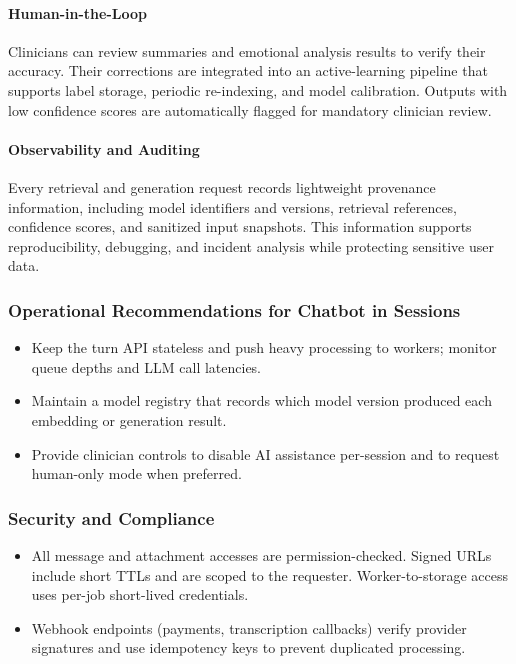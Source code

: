 \documentclass[a4paper,12pt]{report}
\begin{document}
\paragraph{Human-in-the-Loop}
Clinicians can review summaries and emotional analysis results to verify their accuracy. Their corrections are integrated into an active-learning pipeline that supports label storage, periodic re-indexing, and model calibration. Outputs with low confidence scores are automatically flagged for mandatory clinician review.

\paragraph{Observability and Auditing}
Every retrieval and generation request records lightweight provenance information, including model identifiers and versions, retrieval references, confidence scores, and sanitized input snapshots. This information supports reproducibility, debugging, and incident analysis while protecting sensitive user data.

\subsubsection{Operational Recommendations for Chatbot in Sessions}
\begin{itemize}[leftmargin=*]
  \item[--] Keep the turn API stateless and push heavy processing to workers; monitor queue depths and LLM call latencies.
  \item[--] Maintain a model registry that records which model version produced each embedding or generation result.
  \item[--] Provide clinician controls to disable AI assistance per-session and to request human-only mode when preferred.
\end{itemize}

\subsubsection{Security and Compliance}
\begin{itemize}[leftmargin=*]
  \item[--] All message and attachment accesses are permission-checked. Signed URLs include short TTLs and are scoped to the requester. Worker-to-storage access uses per-job short-lived credentials.
  \item[--] Webhook endpoints (payments, transcription callbacks) verify provider signatures and use idempotency keys to prevent duplicated processing.
\end{itemize}
\end{document}
